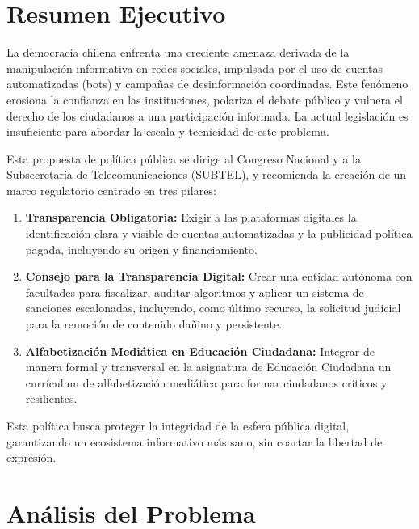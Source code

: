 \documentclass[12pt, letterpaper]{article}
\begin{document}
\section*{Resumen Ejecutivo}
La democracia chilena enfrenta una creciente amenaza derivada de la manipulación informativa en redes sociales, impulsada por el uso de cuentas automatizadas (bots) y campañas de desinformación coordinadas. Este fenómeno erosiona la confianza en las instituciones, polariza el debate público y vulnera el derecho de los ciudadanos a una participación informada. La actual legislación es insuficiente para abordar la escala y tecnicidad de este problema.
\par
Esta propuesta de política pública se dirige al Congreso Nacional y a la Subsecretaría de Telecomunicaciones (SUBTEL), y recomienda la creación de un marco regulatorio centrado en tres pilares:
\begin{enumerate}[label=\arabic*)]
	\item \textbf{Transparencia Obligatoria:} Exigir a las plataformas digitales la identificación clara y visible de cuentas automatizadas y la publicidad política pagada, incluyendo su origen y financiamiento.
	\item \textbf{Consejo para la Transparencia Digital:} Crear una entidad autónoma con facultades para fiscalizar, auditar algoritmos y aplicar un sistema de sanciones escalonadas, incluyendo, como último recurso, la solicitud judicial para la remoción de contenido dañino y persistente.
	\item \textbf{Alfabetización Mediática en Educación Ciudadana:} Integrar de manera formal y transversal en la asignatura de Educación Ciudadana un currículum de alfabetización mediática para formar ciudadanos críticos y resilientes.
\end{enumerate}
Esta política busca proteger la integridad de la esfera pública digital, garantizando un ecosistema informativo más sano, sin coartar la libertad de expresión.

\newpage

\section*{Análisis del Problema}
\thispagestyle{fancy}
\end{document}
